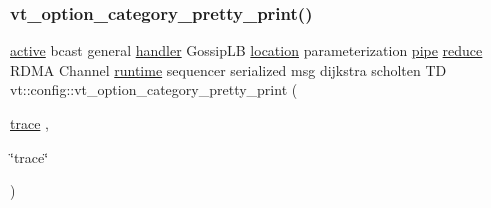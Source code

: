 \subsubsection{\texorpdfstring{vt\+\_\+option\+\_\+category\+\_\+pretty\+\_\+print()}{vt\_option\_category\_pretty\_print()}\hspace{0.1cm}{\footnotesize\ttfamily [15/16]}}
{\footnotesize\ttfamily \hyperlink{namespacevt_1_1config_a6bd1d6215bda0d8ca02811798399f689a82f77c67af0c363709010c6df4dbd920}{active} bcast general \hyperlink{namespacevt_1_1config_a6bd1d6215bda0d8ca02811798399f689a82a0081a94d5c5dfd18b0b3f7eca64b7}{handler} Gossip\+LB \hyperlink{namespacevt_1_1config_a6bd1d6215bda0d8ca02811798399f689aa8d8501591ca3859c828489054b17640}{location} parameterization \hyperlink{namespacevt_1_1config_a6bd1d6215bda0d8ca02811798399f689ad2f6c4149417910966357969e4740fbd}{pipe} \hyperlink{namespacevt_1_1config_a6bd1d6215bda0d8ca02811798399f689af558c370706b5e7bd8ba5224657ca9b4}{reduce} R\+D\+MA Channel \hyperlink{namespacevt_1_1config_a6bd1d6215bda0d8ca02811798399f689afdcadb44dd13617f18aba8d42a257967}{runtime} sequencer serialized msg dijkstra scholten TD vt\+::config\+::vt\+\_\+option\+\_\+category\+\_\+pretty\+\_\+print (\begin{DoxyParamCaption}\item[{\hyperlink{namespacevt_1_1config_a6bd1d6215bda0d8ca02811798399f689aa14cb3132cde2e74239755b4c3944f43}{trace}}]{,  }\item[{\char`\"{}trace\char`\"{}}]{ }\end{DoxyParamCaption})}

\mbox{\label{namespacevt_1_1config_a7e3a06071bac5841f0a671fa2d9cdb3f}} 
